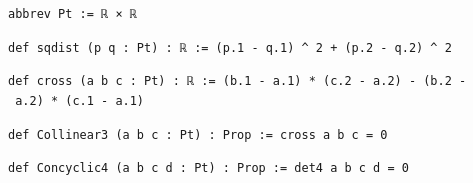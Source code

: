 \documentclass[11pt,a4paper]{article}
\theoremstyle{named}
\begin{document}
\begin{leancode}
\item \texttt{abbrev\ \allowbreak{}Pt\ \allowbreak{}:=\ \allowbreak{}ℝ\ \allowbreak{}×\ \allowbreak{}ℝ}
\item \texttt{def\ \allowbreak{}sqdist\ \allowbreak{}(p\ \allowbreak{}q\ \allowbreak{}:\ \allowbreak{}Pt)\ \allowbreak{}:\ \allowbreak{}ℝ\ \allowbreak{}:=\ \allowbreak{}(p.\allowbreak{}1\ \allowbreak{}-\ \allowbreak{}q.\allowbreak{}1)\ \allowbreak{}\textasciicircum{}\ \allowbreak{}2\ \allowbreak{}+\ \allowbreak{}(p.\allowbreak{}2\ \allowbreak{}-\ \allowbreak{}q.\allowbreak{}2)\ \allowbreak{}\textasciicircum{}\ \allowbreak{}2}
\item \texttt{def\ \allowbreak{}cross\ \allowbreak{}(a\ \allowbreak{}b\ \allowbreak{}c\ \allowbreak{}:\ \allowbreak{}Pt)\ \allowbreak{}:\ \allowbreak{}ℝ\ \allowbreak{}:=\ \allowbreak{}(b.\allowbreak{}1\ \allowbreak{}-\ \allowbreak{}a.\allowbreak{}1)\ \allowbreak{}*\ \allowbreak{}(c.\allowbreak{}2\ \allowbreak{}-\ \allowbreak{}a.\allowbreak{}2)\ \allowbreak{}-\ \allowbreak{}(b.\allowbreak{}2\ \allowbreak{}-\ \allowbreak{}a.\allowbreak{}2)\ \allowbreak{}*\ \allowbreak{}(c.\allowbreak{}1\ \allowbreak{}-\ \allowbreak{}a.\allowbreak{}1)}
\item \texttt{def\ \allowbreak{}Collinear3\ \allowbreak{}(a\ \allowbreak{}b\ \allowbreak{}c\ \allowbreak{}:\ \allowbreak{}Pt)\ \allowbreak{}:\ \allowbreak{}Prop\ \allowbreak{}:=\ \allowbreak{}cross\ \allowbreak{}a\ \allowbreak{}b\ \allowbreak{}c\ \allowbreak{}=\ \allowbreak{}0}
\item \texttt{def\ \allowbreak{}Concyclic4\ \allowbreak{}(a\ \allowbreak{}b\ \allowbreak{}c\ \allowbreak{}d\ \allowbreak{}:\ \allowbreak{}Pt)\ \allowbreak{}:\ \allowbreak{}Prop\ \allowbreak{}:=\ \allowbreak{}det4\ \allowbreak{}a\ \allowbreak{}b\ \allowbreak{}c\ \allowbreak{}d\ \allowbreak{}=\ \allowbreak{}0}

\end{leancode}
\end{document}
